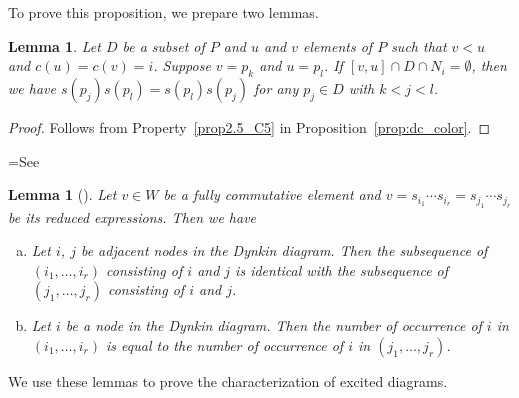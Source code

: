 \documentclass[10pt]{amsart}
\newtheorem{lemm}[theo]{Lemma}
\theoremstyle{definition}
\theoremstyle{remark}
\begin{document}
To prove this proposition, we prepare two lemmas.

\begin{lemm}
\label{lem:comm}
Let $D$ be a subset of $P$ and $u$ and $v$ elements of $P$ such that $v < u$ and $c(u) = c(v) = i$.
Suppose $v = p_k$ and $u = p_l$.
If $[v,u] \cap D \cap N_i = \emptyset$, 
then we have $s(p_j) s(p_l) = s(p_l) s(p_j)$ for any $p_j \in D$ with $k < j < l$. 
\end{lemm}

\begin{proof}
Follows from Property~\ref{prop2.5_C5} in Proposition~\ref{prop:dc_color}.
\end{proof}

\setbox\toto=\hbox{See~\cite[Section~3]{GK}}
\begin{lemm}[\box\toto]
\label{lem:fc}
Let $v \in W$ be a fully commutative element 
and $v = s_{i_1} \cdots s_{i_r} = s_{j_1} \cdots s_{j_r}$ be its reduced expressions.
Then we have
\begin{enumerate}[(a)]
\item\label{lemma3.6_a} %
Let $i$, $j$ be adjacent nodes in the Dynkin diagram.
Then the subsequence of $(i_1, \ldots, i_r)$ consisting of $i$ and $j$ 
is identical with the subsequence of $(j_1, \ldots, j_r)$ consisting of $i$ and $j$.
\item\label{lemma3.6_b} %
Let $i$ be a node in the Dynkin diagram.
Then the number of occurrence of $i$ in $(i_1, \ldots, i_r)$ 
is equal to the number of occurrence of $i$ in $(j_1, \ldots, j_r)$.
\end{enumerate}
\end{lemm}

We use these lemmas to prove the characterization of excited diagrams.
\end{document}

